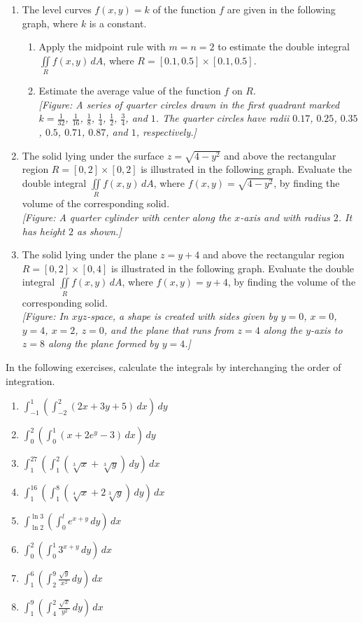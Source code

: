 \documentclass{exercises}
\begin{document}
\begin{enumerate}[resume]
\begin{enumerate}[label=(\alph*)]
\end{enumerate}
\item The level curves $f(x,y)=k$ of the function $f$ are given in the following graph, where $k$ is a constant.
\begin{enumerate}[label=(\alph*)]
  \item Apply the midpoint rule with $m=n=2$ to estimate the double integral $\underset{R}{\iint}f(x,y)\,dA$, where $R=[0.1,0.5]\times [0.1,0.5]$.
  \item Estimate the average value of the function $f$ on $R$.\\ \textit{[Figure: A series of quarter circles drawn in the first quadrant marked $k=\frac{1}{32}$, $\frac{1}{16}$, $\frac{1}{8}$, $\frac{1}{4}$, $\frac{1}{2}$, $\frac{3}{4}$, and $1$. The quarter circles have radii $0.17$, $0.25$, $0.35$, $0.5$, $0.71$, $0.87$, and $1$, respectively.]}
\end{enumerate}
\item The solid lying under the surface $z=\sqrt{4-y^{2}}$ and above the rectangular region $R=[0,2]\times [0,2]$ is illustrated in the following graph. Evaluate the double integral $\underset{R}{\iint}f(x,y)\,dA$, where $f(x,y)=\sqrt{4-y^{2}}$, by finding the volume of the corresponding solid. \\ \textit{[Figure: A quarter cylinder with center along the $x$-axis and with radius $2$. It has height $2$ as shown.]}
\item The solid lying under the plane $z=y+4$ and above the rectangular region $R=[0,2]\times [0,4]$ is illustrated in the following graph. Evaluate the double integral $\underset{R}{\iint}f(x,y)\,dA$, where $f(x,y)=y+4$, by finding the volume of the corresponding solid. \\ \textit{[Figure: In $xyz$-space, a shape is created with sides given by $y=0$, $x=0$, $y=4$, $x=2$, $z=0$, and the plane that runs from $z=4$ along the $y$-axis to $z=8$ along the plane formed by $y=4$.]}
\end{enumerate}

In the following exercises, calculate the integrals by interchanging the order of integration.

\begin{enumerate}[resume]
\item $\int_{-1}^{1}(\int_{-2}^{2}(2x+3y+5)\,dx)\,dy$
\item $\int_{0}^{2}(\int_{0}^{1}(x+2e^{y}-3)\,dx)\,dy$
\item $\int_{1}^{27}(\int_{1}^{2}(\sqrt[3]{x}+\sqrt[3]{y})\,dy)\,dx$
\item $\int_{1}^{16}(\int_{1}^{8}(\sqrt[4]{x}+2\sqrt[3]{y})\,dy)\,dx$
\item $\int_{\ln 2}^{\ln 3}(\int_{0}^{l}e^{x+y}\,dy)\,dx$
\item $\int_{0}^{2}(\int_{0}^{1}3^{x+y}\,dy)\,dx$
\item $\int_{1}^{6}(\int_{2}^{9}\frac{\sqrt{y}}{x^{2}}\,dy)\,dx$
\item $\int_{1}^{9}(\int_{4}^{2}\frac{\sqrt{x}}{y^{2}}\,dy)\,dx$
\end{enumerate}
\end{document}
